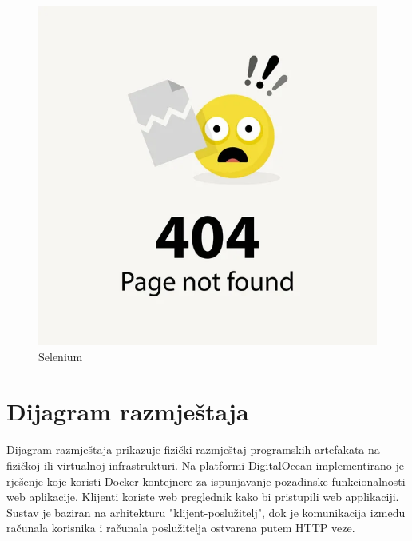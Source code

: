 			\begin{figure}[H]
				\includegraphics[scale=0.4]{slike/error404.png}
				\centering
				\caption{Selenium}
				\label{fig:selenium}
			\end{figure}
			
			\eject 
		
		
		\section{Dijagram razmještaja}

			 \noindent Dijagram razmještaja prikazuje fizički razmještaj programskih artefakata 
			 na fizičkoj ili virtualnoj infrastrukturi. Na platformi DigitalOcean implementirano je
			 rješenje koje koristi Docker kontejnere za ispunjavanje pozadinske funkcionalnosti 
			 web aplikacije. Klijenti koriste web preglednik kako bi pristupili web applikaciji.
			 Sustav je baziran na arhitekturu "klijent-poslužitelj", dok je komunikacija između 
			 računala korisnika i računala poslužitelja ostvarena putem HTTP veze.
			

